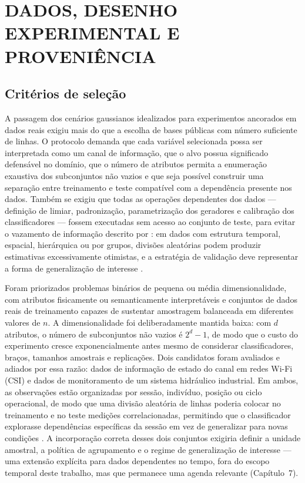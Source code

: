 \chapter{DADOS, DESENHO EXPERIMENTAL E PROVENIÊNCIA}
\label{chap:datasets}

\section{Critérios de seleção}

A passagem dos cenários gaussianos idealizados para experimentos ancorados em dados reais exigiu mais do que a escolha de bases públicas com número suficiente de linhas. O protocolo demanda que cada variável selecionada possa ser interpretada como um canal de informação, que o alvo possua significado defensável no domínio, que o número de atributos permita a enumeração exaustiva dos subconjuntos não vazios e que seja possível construir uma separação entre treinamento e teste compatível com a dependência presente nos dados. Também se exigiu que todas as operações dependentes dos dados --- definição de limiar, padronização, parametrização dos geradores e calibração dos classificadores --- fossem executadas sem acesso ao conjunto de teste, para evitar o vazamento de informação descrito por \textcite{Kaufman2012}: em dados com estrutura temporal, espacial, hierárquica ou por grupos, divisões aleatórias podem produzir estimativas excessivamente otimistas, e a estratégia de validação deve representar a forma de generalização de interesse \cite{Roberts2017,Bergmeir2012}.

Foram priorizados problemas binários de pequena ou média dimensionalidade, com atributos fisicamente ou semanticamente interpretáveis e conjuntos de dados reais de treinamento capazes de sustentar amostragem balanceada em diferentes valores de $n$. A dimensionalidade foi deliberadamente mantida baixa: com $d$ atributos, o número de subconjuntos não vazios é $2^d-1$, de modo que o custo do experimento cresce exponencialmente antes mesmo de considerar classificadores, braços, tamanhos amostrais e replicações. Dois candidatos foram avaliados e adiados por essa razão: dados de informação de estado do canal em redes Wi-Fi (CSI) e dados de monitoramento de um sistema hidráulico industrial. Em ambos, as observações estão organizadas por sessão, indivíduo, posição ou ciclo operacional, de modo que uma divisão aleatória de linhas poderia colocar no treinamento e no teste medições correlacionadas, permitindo que o classificador explorasse dependências específicas da sessão em vez de generalizar para novas condições \cite{Roberts2017,Bergmeir2012}. A incorporação correta desses dois conjuntos exigiria definir a unidade amostral, a política de agrupamento e o regime de generalização de interesse --- uma extensão explícita para dados dependentes no tempo, fora do escopo temporal deste trabalho, mas que permanece uma agenda relevante (Capítulo~7).


